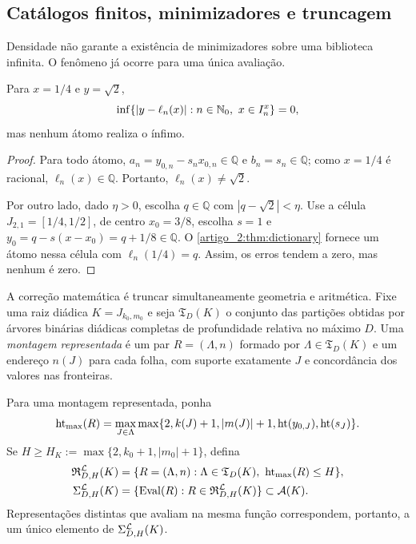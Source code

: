 \subsection{Catálogos finitos, minimizadores e truncagem}

Densidade não garante a existência de minimizadores sobre uma biblioteca
infinita. O fenômeno já ocorre para uma única avaliação.

\begin{proposition}\label{map:artigo_2:3.21}\label{artigo_2:prop:no-minimizer}
Para $x=1/4$ e $y=\sqrt2$,
\[
 \inf\{|y-\ell_n(x)|:n\in\mathbb{N}_0,\ x\in I_n^x\}=0,
\]
mas nenhum átomo realiza o ínfimo.
\end{proposition}

\begin{proof}
Para todo átomo, $a_n=y_{0,n}-s_nx_{0,n}\in\mathbb{Q}$ e
$b_n=s_n\in\mathbb{Q}$; como $x=1/4$ é racional,
$\ell_n(x)\in\mathbb{Q}$. Portanto, $\ell_n(x)\neq\sqrt2$.

Por outro lado, dado $\eta>0$, escolha $q\in\mathbb{Q}$ com
$|q-\sqrt2|<\eta$. Use a célula $J_{2,1}=[1/4,1/2]$, de centro $x_0=3/8$,
escolha $s=1$ e $y_0=q-s(x-x_0)=q+1/8\in\mathbb{Q}$. O
\cref{artigo_2:thm:dictionary} fornece um átomo nessa célula com
$\ell_n(1/4)=q$. Assim, os erros tendem a zero, mas nenhum é zero.
\end{proof}

A correção matemática é truncar simultaneamente geometria e aritmética. Fixe
uma raiz diádica $K=J_{k_0,m_0}$ e seja $\mathfrak T_D(K)$ o conjunto das
partições obtidas por árvores binárias diádicas completas de profundidade
relativa no máximo $D$. Uma \emph{montagem representada} é um par
$R=(\Lambda,n)$ formado por $\Lambda\in\mathfrak T_D(K)$ e um endereço
$n(J)$ para cada folha, com suporte exatamente $J$ e concordância dos valores
nas fronteiras.

\begin{definition}\label{map:artigo_2:3.22}\label{artigo_2:def:finite-catalog}
Para uma montagem representada, ponha
\[
 \operatorname{ht}_{\max}(R)=\max_{J\in\Lambda}
 \max\{2,k(J)+1,|m(J)|+1,\operatorname{ht}(y_{0,J}),\operatorname{ht}(s_J)\}.
\]
Se
$H\ge H_K:=\max\{2,k_0+1,|m_0|+1\}$, defina
\begin{align}
 \mathfrak R_{D,H}^{\mathcal{L}}(K)
   &=\{R=(\Lambda,n):\Lambda\in\mathfrak T_D(K),\
       \operatorname{ht}_{\max}(R)\le H\},\label{artigo_2:eq:represented-catalog}\\
 \Sigma_{D,H}^{\mathcal{L}}(K)
   &=\{\operatorname{Eval}(R):R\in
       \mathfrak R_{D,H}^{\mathcal{L}}(K)\}\subset\mathcal{A}(K).
 \label{artigo_2:eq:finite-catalog}
\end{align}
Representações distintas que avaliam na mesma função correspondem, portanto,
a um único elemento de $\Sigma_{D,H}^{\mathcal{L}}(K)$.
\end{definition}

